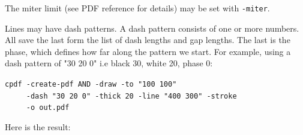 \documentclass{book}
\begin{document}
\noindent The miter limit (see PDF reference for details) may be set with \texttt{-miter}.

Lines may have dash patterns. A dash pattern consists of one or more numbers. All save the last form the list of dash lengths and gap lengths. The last is the phase, which defines how far along the pattern we start. For example, using a dash pattern of "30 20 0" i.e black 30, white 20, phase 0:

\begin{framed}
 \noindent\small\verb?cpdf -create-pdf AND -draw -to "100 100"?\\
 \noindent\small\verb?     -dash "30 20 0" -thick 20 -line "400 300" -stroke?\\
 \noindent\small\verb?     -o out.pdf?
\end{framed}

\noindent Here is the result:
\end{document}
